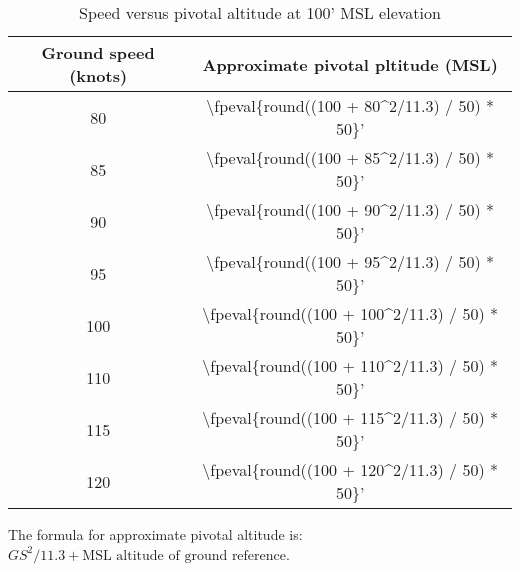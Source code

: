 \begin{table}[ht]
    \caption{Speed versus pivotal altitude at 100' MSL elevation}

    \begin{center}
        \begin{tabular}{cc}
            \toprule
            \textbf{Ground speed (knots)} & \textbf{Approximate pivotal pltitude (MSL)}         \\
            \midrule
            80                            & \num{\fpeval{round((100 + 80^2/11.3) / 50) * 50}}'  \\
            85                            & \num{\fpeval{round((100 + 85^2/11.3) / 50) * 50}}'  \\
            90                            & \num{\fpeval{round((100 + 90^2/11.3) / 50) * 50}}'  \\
            95                            & \num{\fpeval{round((100 + 95^2/11.3) / 50) * 50}}'  \\
            100                           & \num{\fpeval{round((100 + 100^2/11.3) / 50) * 50}}' \\
            110                           & \num{\fpeval{round((100 + 110^2/11.3) / 50) * 50}}' \\
            115                           & \num{\fpeval{round((100 + 115^2/11.3) / 50) * 50}}' \\
            120                           & \num{\fpeval{round((100 + 120^2/11.3) / 50) * 50}}' \\
            \bottomrule
        \end{tabular}

        \hfill

        The formula for approximate pivotal altitude is: $GS^2 / 11.3 + \textrm{MSL altitude of ground reference}$.
    \end{center}
\end{table}
